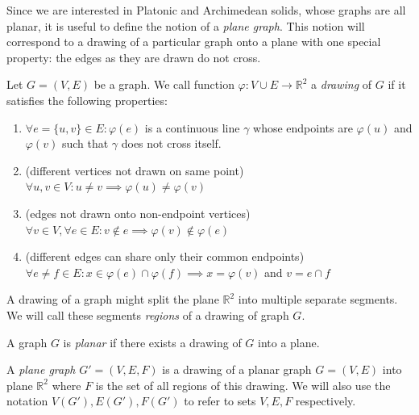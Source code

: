 \begin{highlight}
Since we are interested in Platonic and Archimedean solids, whose graphs are all planar, it is useful to define the notion of a \textit{plane graph}. This notion will correspond to a drawing of a particular graph onto a plane with one special property: the edges as they are drawn do not cross.

\begin{definition}
    Let $G=(V,E)$ be a graph. We call function $\varphi : V \cup E \rightarrow \mathbb{R}^2$ a \textit{drawing} of $G$ if it satisfies the following properties:
    \begin{enumerate}
    
        \item $\forall e=\{u,v\} \in E : \varphi(e)$ is a continuous line $\gamma$ whose endpoints are $\varphi(u)$ and $\varphi(v)$ such that $\gamma$ does not cross itself.
        
        \item (different vertices not drawn on same point) \\ $\forall u,v \in V : u \neq v \implies \varphi(u) \neq \varphi(v)$
        
        \item (edges not drawn onto non-endpoint vertices) \\ $\forall v \in V, \forall e \in E: v \notin e \implies \varphi(v) \notin \varphi(e)$
        
        \item (different edges can share only their common endpoints) \\ $\forall e \neq f \in E : x \in \varphi(e) \cap \varphi(f) \implies x = \varphi(v)$ and $v = e \cap f$
    \end{enumerate}
\end{definition}

A drawing of a graph might split the plane $\mathbb{R}^2$ into multiple separate segments. We will call these segments \textit{regions} of a drawing of graph $G$.

\begin{definition}
    A graph $G$ is \textit{planar} if there exists a drawing of $G$ into a plane.
\end{definition}

\begin{definition}
    A \textit{plane graph} $G' = (V,E,F)$ is a drawing of a planar graph $G=(V,E)$ into plane $\mathbb{R}^2$ where $F$ is the set of all regions of this drawing. We will also use the notation $V(G'), E(G'), F(G')$ to refer to sets $V,E,F$ respectively.
\end{definition}

\end{highlight}

